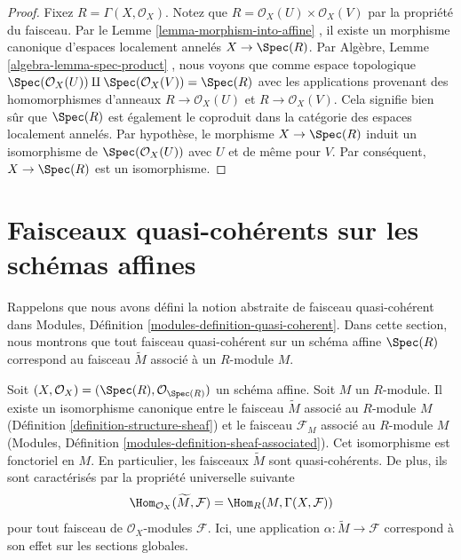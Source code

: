 \begin{proof}
Fixez  $R = \Gamma(X, \mathcal{O}_X)$. Notez que  $R = \mathcal{O}_X(U) \times \mathcal{O}_X(V)$  par la propriété du faisceau. Par le
Lemme  \ref{lemma-morphism-into-affine} , il existe un morphisme canonique d'espaces localement annelés
 $X \to \Spec(R)$. Par Algèbre, Lemme  \ref{algebra-lemma-spec-product} , nous voyons que comme espace
topologique  $\Spec(\mathcal{O}_X(U)) \amalg \Spec(\mathcal{O}_X(V)) =
\Spec(R)$  avec les applications provenant des homomorphismes
d'anneaux  $R \to \mathcal{O}_X(U)$  et  $R \to \mathcal{O}_X(V)$. Cela signifie bien sûr que  $\Spec(R)$ 
est également le coproduit dans la catégorie des espaces localement annelés. Par
hypothèse, le morphisme  $X \to \Spec(R)$  induit un isomorphisme de  $\Spec(\mathcal{O}_X(U))$  avec
 $U$  et de même pour  $V$. Par conséquent,  $X \to \Spec(R)$  est un
isomorphisme.
\end{proof}















\section{Faisceaux quasi-cohérents sur les schémas affines}
\label{section-quasi-coherent-affine}

\noindent
Rappelons que nous avons défini la notion abstraite de faisceau quasi-cohérent
dans Modules, Définition  \ref{modules-definition-quasi-coherent}. Dans cette section, nous montrons que tout
faisceau quasi-cohérent sur un schéma affine  $\Spec(R)$  correspond au faisceau
 $\widetilde M$  associé à un  $R$-module  $M$.

\begin{lemma}
\label{lemma-compare-constructions}
Soit  $(X, \mathcal{O}_X) = (\Spec(R), \mathcal{O}_{\Spec(R)})$  un schéma affine. Soit  $M$  un  $R$-module. Il
existe un isomorphisme canonique entre le faisceau  $\widetilde M$  associé au
 $R$-module  $M$  (Définition  \ref{definition-structure-sheaf}) et le faisceau
 $\mathcal{F}_M$  associé au  $R$-module  $M$  (Modules, Définition
 \ref{modules-definition-sheaf-associated}). Cet isomorphisme est fonctoriel en  $M$. En particulier,
les faisceaux  $\widetilde M$  sont quasi-cohérents. De plus, ils sont caractérisés
par la propriété universelle suivante
$$
\Hom_{\mathcal{O}_X}(\widetilde M, \mathcal{F})
=
\Hom_R(M, \Gamma(X, \mathcal{F}))
$$
pour tout faisceau de  $\mathcal{O}_X$-modules  $\mathcal{F}$. Ici, une application
 $\alpha : \widetilde M \to \mathcal{F}$  correspond à son effet sur les sections globales.
\end{lemma}

